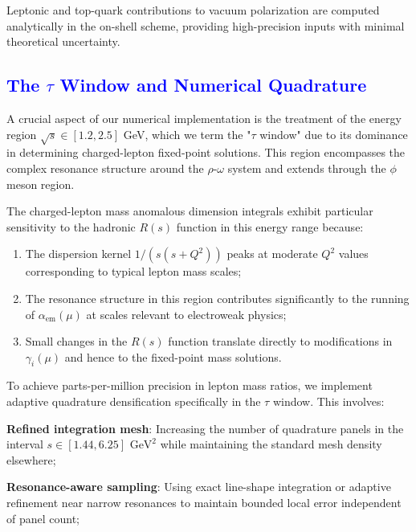 \documentclass[%
amsmath,amssymb,
aps,
prb,
floatfix, showkeys, 10pt,
]{revtex4-2}
\newcommand{\modif}[1]{\textcolor{blue}{#1}}
\begin{document}
Leptonic and top-quark contributions to vacuum polarization are computed analytically in the on-shell scheme, providing high-precision inputs with minimal theoretical uncertainty.














{\modif{  \subsection{The $\tau$ Window and Numerical Quadrature}
\label{subsec:tau_window}   }}
A crucial aspect of our numerical implementation is the treatment of the energy region $\sqrt{s} \in [1.2, 2.5]$ GeV, which we term the "$\tau$ window" due to its dominance in determining charged-lepton fixed-point solutions. This region encompasses the complex resonance structure around the $\rho$-$\omega$ system and extends through the $\phi$ meson region.

The charged-lepton mass anomalous dimension integrals exhibit particular sensitivity to the hadronic $R(s)$ function in this energy range because:
\begin{enumerate}
\item The dispersion kernel $1/(s(s + Q^2))$ peaks at moderate $Q^2$ values corresponding to typical lepton mass scales;

\item The resonance structure in this region contributes significantly to the running of $\alpha_{\text{em}}(\mu)$ at scales relevant to electroweak physics;

\item Small changes in the $R(s)$ function translate directly to modifications in $\gamma_i(\mu)$ and hence to the fixed-point mass solutions.
\end{enumerate}

To achieve parts-per-million precision in lepton mass ratios, we implement adaptive quadrature densification specifically in the $\tau$ window. This involves:

\textbf{Refined integration mesh}: Increasing the number of quadrature panels in the interval $s \in [1.44, 6.25] \text{ GeV}^2$ while maintaining the standard mesh density elsewhere;

\textbf{Resonance-aware sampling}: Using exact line-shape integration or adaptive refinement near narrow resonances to maintain bounded local error independent of panel count;
\end{document}
